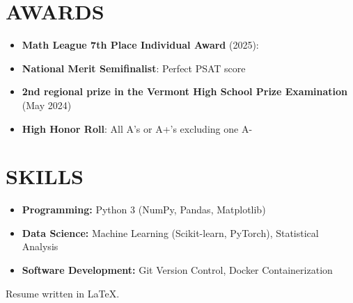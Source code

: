 \documentclass[11pt,letterpaper]{article}
\begin{document}
\vspace{1em}
\section{AWARDS}

\vspace{0.5em}
\begin{itemize}[leftmargin=*,nosep]
  \item \textbf{Math League 7th Place Individual Award} (2025): 
  \item \textbf{National Merit Semifinalist}: Perfect PSAT score
  \item \textbf{2nd regional prize in the Vermont High School Prize Examination} (May 2024)
  \item \textbf{High Honor Roll}: All A's or A+'s excluding one A- 
\end{itemize}

\vspace{1em}
\section{SKILLS}

\vspace{0.5em}
\begin{itemize}[leftmargin=*,nosep]
  \item \textbf{Programming:} Python 3 (NumPy, Pandas, Matplotlib)
  \item \textbf{Data Science:} Machine Learning (Scikit-learn, PyTorch), Statistical Analysis
  \item \textbf{Software Development:} Git Version Control, Docker Containerization
\end{itemize}

\begin{flushleft}
  \vspace{0.5em}
  Resume written in \LaTeX.
\end{flushleft}
\end{document}
